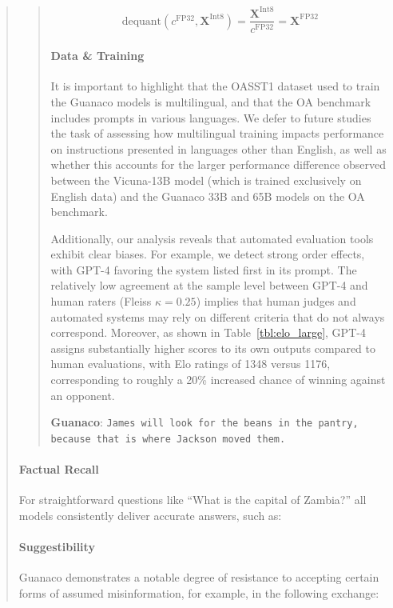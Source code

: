 \begin{quote}
\begin{quote}
\begin{equation}
    \text{dequant}(c^{\text{FP32}}, \mathbf{X}^{\text{Int8}}) = \frac{\mathbf{X}^{\text{Int8}}}{c^{\text{FP32}}} = \mathbf{X}^{\text{FP32}}
\end{equation}

\paragraph{Data \& Training} It is important to highlight that the OASST1 dataset used to train the {Guanaco} models is multilingual, and that the OA benchmark includes prompts in various languages. We defer to future studies the task of assessing how multilingual training impacts performance on instructions presented in languages other than English, as well as whether this accounts for the larger performance difference observed between the Vicuna-13B model (which is trained exclusively on English data) and the {Guanaco} 33B and 65B models on the OA benchmark.

Additionally, our analysis reveals that automated evaluation tools exhibit clear biases. For example, we detect strong order effects, with GPT-4 favoring the system listed first in its prompt. The relatively low agreement at the sample level between GPT-4 and human raters (Fleiss $\kappa=0.25$) implies that human judges and automated systems may rely on different criteria that do not always correspond. Moreover, as shown in Table~\ref{tbl:elo_large}, GPT-4 assigns substantially higher scores to its own outputs compared to human evaluations, with Elo ratings of 1348 versus 1176, corresponding to roughly a 20\% increased chance of winning against an opponent.

    \textbf{Guanaco}: \texttt{James will look for the beans in the pantry, because that is where Jackson moved them.}
\end{quote}

\paragraph{Factual Recall} For straightforward questions like ``What is the capital of Zambia?'' all models consistently deliver accurate answers, such as:

\paragraph{Suggestibility} {Guanaco} demonstrates a notable degree of resistance to accepting certain forms of assumed misinformation, for example, in the following exchange:


\end{quote}
